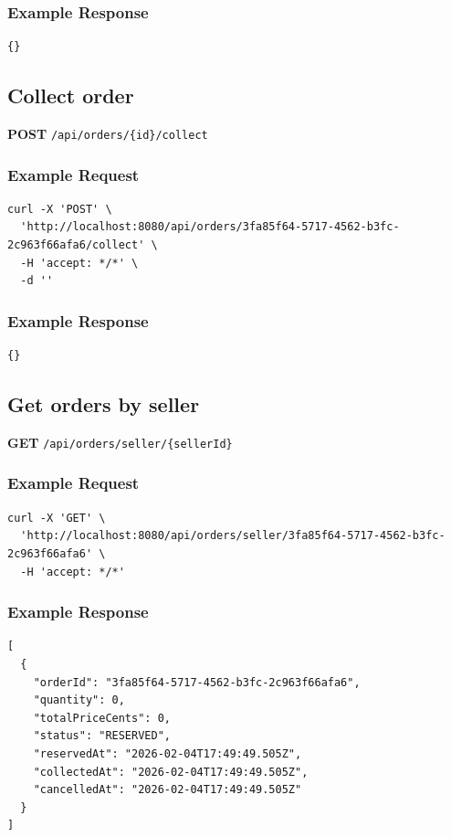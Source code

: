 \documentclass[a4paper,11pt]{article}
\begin{document}
\subsubsection*{Example Response}
\begin{lstlisting}
{}
\end{lstlisting}

\subsection{Collect order}
\textbf{POST} \texttt{/api/orders/\{id\}/collect}
\subsubsection*{Example Request}
\begin{lstlisting}
curl -X 'POST' \
  'http://localhost:8080/api/orders/3fa85f64-5717-4562-b3fc-2c963f66afa6/collect' \
  -H 'accept: */*' \
  -d ''
\end{lstlisting}

\subsubsection*{Example Response}
\begin{lstlisting}
{}
\end{lstlisting}

\subsection{Get orders by seller}
\textbf{GET} \texttt{/api/orders/seller/\{sellerId\}}
\subsubsection*{Example Request}
\begin{lstlisting}
curl -X 'GET' \
  'http://localhost:8080/api/orders/seller/3fa85f64-5717-4562-b3fc-2c963f66afa6' \
  -H 'accept: */*'
\end{lstlisting}

\subsubsection*{Example Response}
\begin{lstlisting}
[
  {
    "orderId": "3fa85f64-5717-4562-b3fc-2c963f66afa6",
    "quantity": 0,
    "totalPriceCents": 0,
    "status": "RESERVED",
    "reservedAt": "2026-02-04T17:49:49.505Z",
    "collectedAt": "2026-02-04T17:49:49.505Z",
    "cancelledAt": "2026-02-04T17:49:49.505Z"
  }
]
\end{lstlisting}
\end{document}
